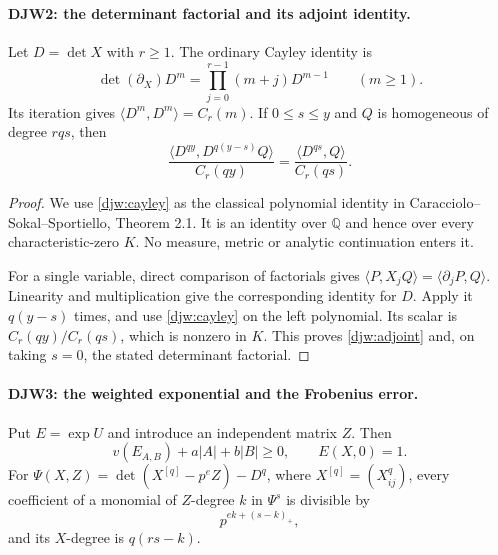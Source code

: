 \paragraph{DJW2: the determinant factorial and its adjoint identity.}
\label{claim:DJW2}
Let $D=\det X$ with $r\ge1$.  The ordinary Cayley identity is
\begin{equation}
 \det(\partial_X)D^m=
       \prod_{j=0}^{r-1}(m+j)D^{m-1}\qquad(m\ge1).
 \label{djw:cayley}
\end{equation}
Its iteration gives
$\langle D^m,D^m\rangle=C_r(m)$.
If $0\le s\le y$ and $Q$ is homogeneous of degree $rqs$, then
\begin{equation}
 \frac{\langle D^{qy},D^{q(y-s)}Q\rangle}{C_r(qy)}
       =\frac{\langle D^{qs},Q\rangle}{C_r(qs)}.
 \label{djw:adjoint}
\end{equation}

\begin{proof}
We use \eqref{djw:cayley} as the classical polynomial identity in
Caracciolo--Sokal--Sportiello, Theorem 2.1.  It is an identity over
$\mathbb Q$ and hence over every characteristic-zero $K$.
No measure, metric or analytic continuation enters it.

For a single variable, direct comparison of factorials gives
$\langle P,X_jQ\rangle=\langle\partial_jP,Q\rangle$.
Linearity and multiplication give the corresponding identity for
$D$.  Apply it $q(y-s)$ times, and use \eqref{djw:cayley} on the
left polynomial.  Its scalar is $C_r(qy)/C_r(qs)$, which is nonzero
in $K$.  This proves \eqref{djw:adjoint} and, on taking $s=0$,
the stated determinant factorial.
\end{proof}

\paragraph{DJW3: the weighted exponential and the Frobenius error.}
\label{claim:DJW3}
Put $E=\exp U$ and introduce an independent matrix $Z$.
Then
\begin{equation}
 v(E_{A,B})+a|A|+b|B|\ge0,\qquad E(X,0)=1.
 \label{djw:weightedexp}
\end{equation}
For
$\Psi(X,Z)=\det(X^{[q]}-p^eZ)-D^q$, where
$X^{[q]}=(X_{ij}^q)$, every coefficient of a monomial of
$Z$-degree $k$ in $\Psi^s$ is divisible by
\begin{equation}
 p^{ek+(s-k)_+},
 \label{djw:psidiv}
\end{equation}
and its $X$-degree is $q(rs-k)$.


